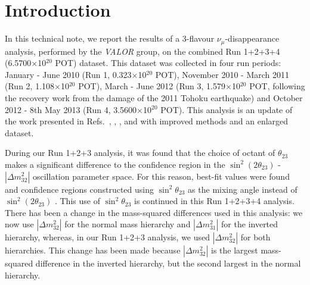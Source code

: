 \clearpage

\section {Introduction }
\label{sec:intro}

In this technical note, 
we report the results of a 3-flavour $\nu_{\mu}$-disappearance analysis,
performed by the {\em VALOR} group,        
on the combined Run 1+2+3+4 (6.5700$\times$10$^{20}$ POT) dataset.
This dataset was collected in four run periods:
January - June 2010 (Run 1, 0.323$\times$10$^{20}$ POT),
November 2010 - March 2011 (Run 2, 1.108$\times$10$^{20}$ POT),
March - June 2012 (Run 3, 1.579$\times$10$^{20}$ POT, following the recovery work from the damage of the 2011 Tohoku earthquake) and
October 2012 - 8th May 2013 (Run 4, 3.5600$\times$10$^{20}$ POT).
This analysis is an update of the work presented in Refs.\ \cite{OurRun1DisappAnalysis}, \cite{OurRun12DisappAnalysis}, 
\cite{OurRun12DisappAnalysis3Flavour},
\cite{OurRun123DisappAnalysis3Flavour} and 
\cite{OurRun1234aDisappAnalysis3Flavour} with improved methods and an enlarged dataset. 

During our Run 1+2+3 analysis, it was found that the choice of octant of $\theta_{23}$ makes a significant difference to the 
confidence region in the $\sin^{2}(2\theta_{23})$ - $|\Delta m^{2}_{32}|$ oscillation parameter space. For this reason, best-fit values 
were found and confidence regions constructed using $\sin^{2}\theta_{23}$ as the mixing angle instead of $\sin^{2}(2\theta_{23})$ 
\cite{OurRun123DisappAnalysis3Flavour}.   
This use of $\sin^{2}\theta_{23}$ is continued in this Run 1+2+3+4 analysis. There has been a change in the mass-squared 
differences used in this analysis: we now use $|\Delta m^{2}_{32}|$ for the normal mass hierarchy and $|\Delta m^{2}_{31}|$ for 
the inverted hierarchy, whereas, in our Run 1+2+3 analysis, we used $|\Delta m^{2}_{32}|$ for both hierarchies. This change has 
been made because $|\Delta m^{2}_{32}|$ is the largest mass-squared difference in the inverted hierarchy, but the second largest 
in the normal hierarchy.

